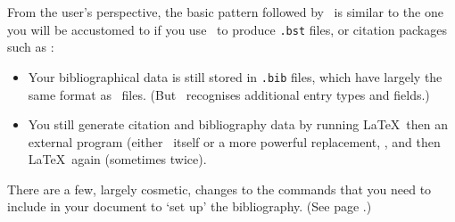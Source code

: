 From the user's perspective, the basic pattern followed by \biblatex\
is similar to the one you will be accustomed to if you use \bibtex\
to produce \verb|.bst| files, or citation packages such as :
\begin{itemize}
\item Your bibliographical data is still stored in \verb|.bib| files,
  which have largely the same format as \bibtex\ files. (But
  \biblatex\ recognises additional entry types and fields.)
\item You still generate citation and bibliography data by running
  \LaTeX\, then an external program (either \bibtex\ itself or a more
  powerful replacement, \package{Biber}, and then \LaTeX\ again
  (sometimes twice).
\end{itemize}

There are a few, largely cosmetic, changes to the commands that you
need to include in your document to `set up' the bibliography. (See
page \pageref{bibtex:simple:eg}.)

